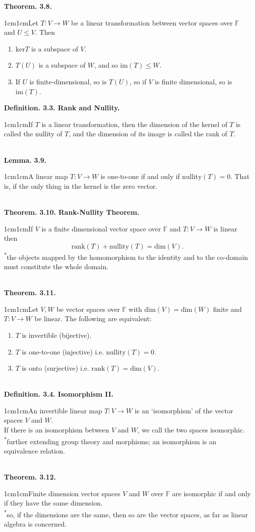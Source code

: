 \documentclass{article}
\newcommand{\definition}[2]{\textbf{Definition. #1.}\begin{adjustwidth}{1cm}{1cm}#2\end{adjustwidth}}
\newcommand{\theorem}[2]{\textbf{Theorem. #1.}\begin{adjustwidth}{1cm}{1cm}#2\end{adjustwidth}}
\newcommand{\lemma}[2]{\textbf{Lemma. #1.}\begin{adjustwidth}{1cm}{1cm}#2\end{adjustwidth}}
\begin{document}
\theorem{3.8}{Let $T : V \rightarrow W$ be a linear transformation between vector spaces over $\mathbb{F}$ and $U \leq V$. Then \begin{enumerate} \item $\text{ker}T$ is a subspace of $V$. \item $T(U)$ is a subspace of $W$, and so $\text{im}(T) \leq W$. \item If $U$ is finite-dimensional, so is $T(U)$, so if $V$ is finite dimensional, so is $\text{im}(T)$.\end{enumerate}}\newpage
\definition{3.3. Rank and Nullity}{If $T$ is a linear transformation, then the dimension of the kernel of $T$ is called the nullity of $T$, and the dimension of its image is called the rank of $T$.}~\\
\lemma{3.9}{A linear map $T: V \rightarrow W$ is one-to-one if and only if $\text{nullity}(T) = 0$. That is, if the only thing in the kernel is the zero vector.}~\\
\theorem{3.10. Rank-Nullity Theorem}{If $V$ is a finite dimensional vector space over $\mathbb{F}$ and $T : V \rightarrow W$ is linear then \[ \text{rank}(T) + \text{nullity}(T) = \text{dim}(V).\]\textsuperscript{*}the objects mapped by the homomorphism to the identity and to the co-domain must constitute the whole domain.}~\\
\theorem{3.11}{Let $V, W$ be vector spaces over $\mathbb{F}$ with $\text{dim}(V) = \text{dim}(W)$ finite and $T:V \rightarrow W$ be linear. The following are equivalent: \begin{enumerate} \item $T$ is invertible (bijective). \item $T$ is one-to-one (injective) i.e. $\text{nullity}(T) = 0$. \item $T$ is onto (surjective) i.e. $\text{rank}(T) = \text{dim}(V)$.\end{enumerate}}~\\
\definition{3.4. Isomorphism II}{An invertible linear map $T: V \rightarrow W$ is an `isomorphism' of the vector spaces $V$ and $W$.\\If there is an isomorphism between $V$ and $W$, we call the two spaces isomorphic.\\[1\baselineskip]\textsuperscript{*}further extending group theory and morphisms; an isomorphism is an equivalence relation.}~\\
\theorem{3.12}{Finite dimension vector spaces $V$ and $W$ over $\mathbb{F}$ are isomorphic if and only if they have the same dimension.\\[1\baselineskip]\textsuperscript{*}so, if the dimensions are the same, then so are the vector spaces, as far as linear algebra is concerned.}\newpage
\end{document}
